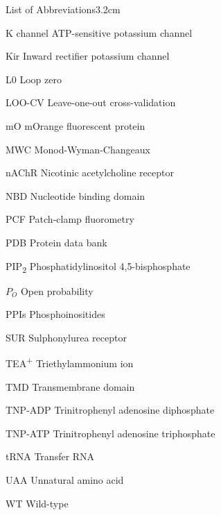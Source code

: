 \begin{mclistof}{List of Abbreviations}{3.2cm}
\item[K\ATP{} channel] ATP-sensitive potassium channel

\item[Kir] Inward rectifier potassium channel

\item[L0] Loop zero

\item[LOO-CV] Leave-one-out cross-validation

\item[mO] mOrange fluorescent protein

\item[MWC] Monod-Wyman-Changeaux

\item[nAChR] Nicotinic acetylcholine receptor

\item[NBD] Nucleotide binding domain

\item[PCF] Patch-clamp fluorometry

\item[PDB] Protein data bank

\item[PIP\textsubscript{2}] Phosphatidylinositol 4,5-bisphosphate

\item[$P_O$] Open probability

\item[PPIs] Phosphoinositides

\item[SUR] Sulphonylurea receptor

\item[TEA\textsuperscript{+}] Triethylammonium ion

\item[TMD] Transmembrane domain

\item[TNP-ADP] Trinitrophenyl adenosine diphosphate

\item[TNP-ATP] Trinitrophenyl adenosine triphosphate

\item[tRNA] Transfer RNA

\item[UAA] Unnatural amino acid

\item[WT] Wild-type

\end{mclistof}

